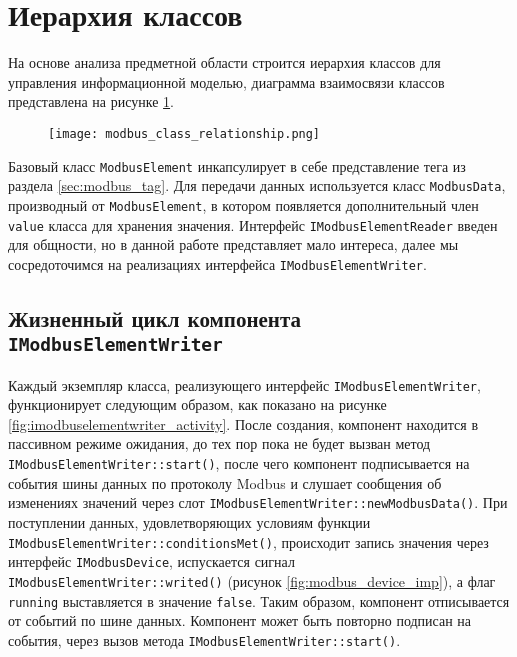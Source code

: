 \section{Иерархия классов}
На основе анализа предметной области строится иерархия классов для управления информационной моделью,
диаграмма взаимосвязи классов представлена на рисунке \ref{fig:modbus_class_uml}. 
\begin{landscape}
    \begin{center}
        \begin{figure}[h!]
            \texttt{[image: modbus\_class\_relationship.png]}
            \caption{}\label{fig:modbus_class_uml}
        \end{figure}
    \end{center}
\end{landscape}
Базовый класс \texttt{ModbusElement} инкапсулирует в себе представление тега из раздела \ref{sec:modbus_tag}.
Для передачи данных используется класс \texttt{ModbusData}, производный от \texttt{ModbusElement},
в котором появляется дополнительный член \texttt{value} класса для хранения значения.
Интерфейс \texttt{IModbusElementReader} введен для общности, но в данной работе представляет мало интереса, далее мы сосредоточимся 
на реализациях интерфейса \texttt{IModbusElementWriter}.


\subsection{Жизненный цикл компонента \texttt{IModbusElementWriter}}
Каждый экземпляр класса, реализующего интерфейс \texttt{IModbusElementWriter},
функционирует следующим образом, как показано на рисунке \ref{fig:imodbuselementwriter_activity}.
После создания, компонент находится в пассивном режиме ожидания, до тех пор пока не будет вызван
метод \texttt{IModbusElementWriter::start()},
после чего компонент подписывается на события шины данных по протоколу Modbus
и слушает сообщения об изменениях значений через слот \texttt{IModbusElementWriter::newModbusData()}.
При поступлении данных, удовлетворяющих условиям функции \texttt{IModbusElementWriter::conditionsMet()},
происходит запись значения через интерфейс \texttt{IModbusDevice}, испускается сигнал \texttt{IModbusElementWriter::writed()}
(рисунок \ref{fig:modbus_device_imp}),
а флаг \texttt{running} выставляется в значение \texttt{false}.
Таким образом, компонент отписывается от событий по шине данных.
Компонент может быть повторно подписан на события, через вызов метода \texttt{IModbusElementWriter::start()}.


